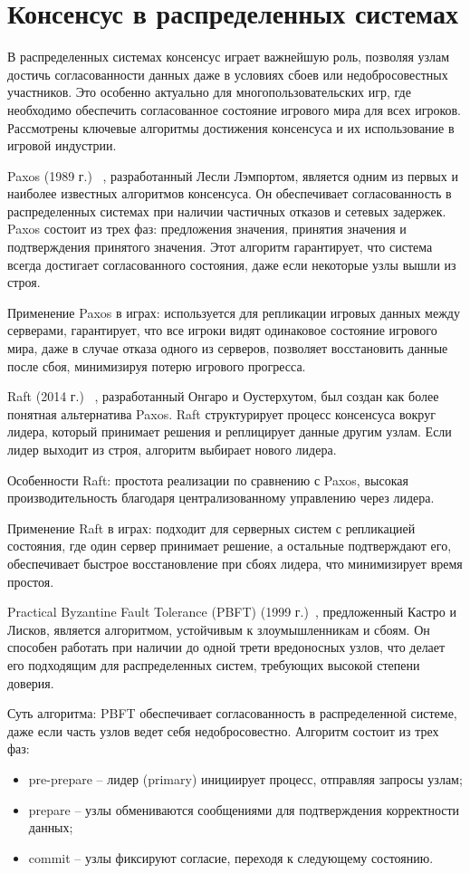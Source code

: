\chapter{Консенсус в распределенных системах}
В распределенных системах консенсус играет важнейшую роль, позволяя узлам достичь согласованности данных даже в условиях сбоев или недобросовестных участников. Это особенно актуально для многопользовательских игр, где необходимо обеспечить согласованное состояние игрового мира для всех игроков. Рассмотрены ключевые алгоритмы достижения консенсуса и их использование в игровой индустрии.

Paxos (1989 г.) ~\cite{b1}, разработанный Лесли Лэмпортом, является одним из первых и наиболее известных алгоритмов консенсуса. Он обеспечивает согласованность в распределенных системах при наличии частичных отказов и сетевых задержек. Paxos состоит из трех фаз: предложения значения, принятия значения и подтверждения принятого значения. Этот алгоритм гарантирует, что система всегда достигает согласованного состояния, даже если некоторые узлы вышли из строя.

Применение Paxos в играх: используется для репликации игровых данных между серверами, гарантирует, что все игроки видят одинаковое состояние игрового мира, даже в случае отказа одного из серверов, позволяет восстановить данные после сбоя, минимизируя потерю игрового прогресса.

Raft (2014 г.) ~\cite{b2}, разработанный Онгаро и Оустерхутом, был создан как более понятная альтернатива Paxos. Raft структурирует процесс консенсуса вокруг лидера, который принимает решения и реплицирует данные другим узлам. Если лидер выходит из строя, алгоритм выбирает нового лидера.

Особенности Raft: простота реализации по сравнению с Paxos, высокая производительность благодаря централизованному управлению через лидера.

Применение Raft в играх: подходит для серверных систем с репликацией состояния, где один сервер принимает решение, а остальные подтверждают его, обеспечивает быстрое восстановление при сбоях лидера, что минимизирует время простоя.

Practical Byzantine Fault Tolerance (PBFT) (1999 г.)~\cite{b3}, предложенный Кастро и Лисков, является алгоритмом, устойчивым к злоумышленникам и сбоям. Он способен работать при наличии до одной трети вредоносных узлов, что делает его подходящим для распределенных систем, требующих высокой степени доверия.

Суть алгоритма: PBFT обеспечивает согласованность в распределенной системе, даже если часть узлов ведет себя недобросовестно. Алгоритм состоит из трех фаз:
\begin{itemize}
	\item pre-prepare -- лидер (primary) инициирует процесс, отправляя запросы узлам;
	\item prepare -- узлы обмениваются сообщениями для подтверждения корректности данных;
	\item commit -- узлы фиксируют согласие, переходя к следующему состоянию.
\end{itemize}

